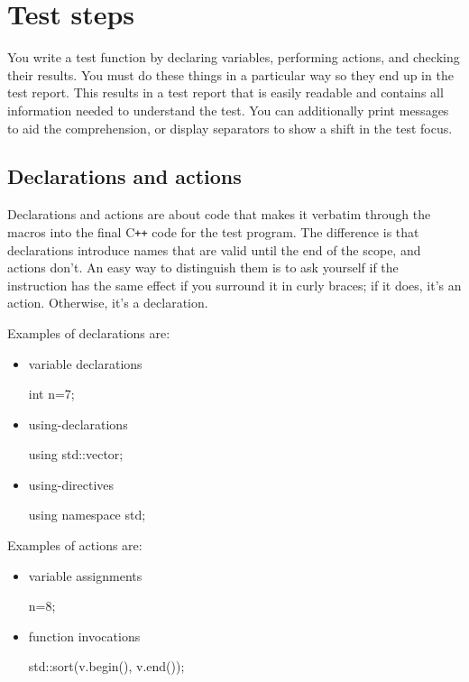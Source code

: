 \documentclass[twoside, a4paper, article]{memoir}
\newcommand*\Cpp{C\texttt{++}}
\begin{document}
\chapter{Test steps}
\label{cha:test-steps}

You write a test function by declaring variables, performing actions, and
checking their results.  You must do these things in a particular way so they
end up in the test report.  This results in a test report that is easily
readable and contains all information needed to understand the test.  You can
additionally print messages to aid the comprehension, or display separators to
show a shift in the test focus.

\section{Declarations and actions}
\label{sec:declarations-actions}

Declarations and actions are about code that makes it verbatim through the
macros into the final \Cpp{} code for the test program.  The difference is that
declarations introduce names that are valid until the end of the scope, and
actions don't.  An easy way to distinguish them is to ask yourself if the
instruction has the same effect if you surround it in curly braces; if it does,
it's an action. Otherwise, it's a declaration.

Examples of declarations are:
\begin{itemize}
\item variable declarations
\begin{cpplisting}
int n=7;
\end{cpplisting}

\item using-declarations
\begin{cpplisting}
using std::vector;
\end{cpplisting}

\item using-directives
\begin{cpplisting}
using namespace std;
\end{cpplisting}
\end{itemize}

Examples of actions are:
\begin{itemize}
\item variable assignments
\begin{cpplisting}
n=8;
\end{cpplisting}

\item function invocations
\begin{cpplisting}
std::sort(v.begin(), v.end());
\end{cpplisting}
\end{itemize}
\end{document}
